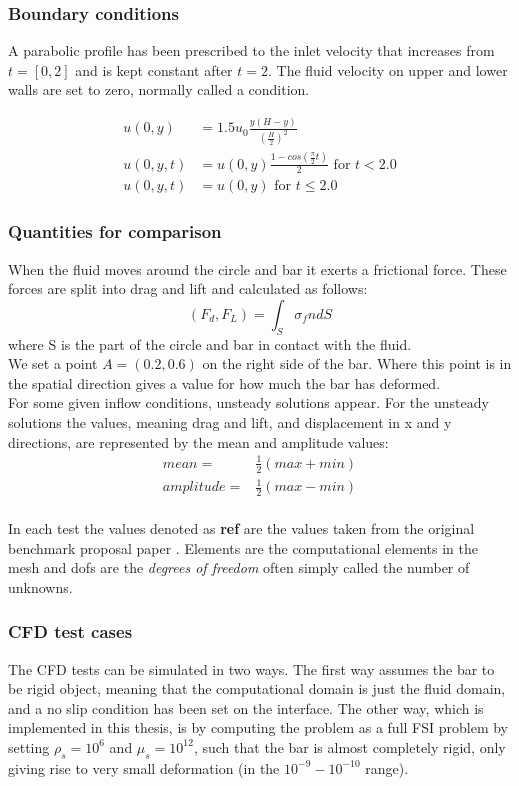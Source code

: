 \subsubsection*{Boundary conditions}
A parabolic profile has been prescribed to the inlet velocity that increases from $t=[0,2]$ and is kept constant after $t = 2$.
The fluid velocity on upper and lower walls are set to zero, normally called a  condition.

\begin{align*}
u(0,y) &= 1.5u_0 \frac{y(H-y)}{(\frac{H}{2})^2}  \\
u(0,y,t) &= u(0,y)\frac{1-cos(\frac{\pi}{2}t)}{2} \text{  for  } t<2.0 \\
u(0,y,t) &= u(0,y) \text{  for  } t \leq 2.0
\end{align*}

\subsubsection*{Quantities for comparison}
When the fluid moves around the circle and bar it exerts a frictional force. These forces are split into drag and lift and calculated as follows:
$$ (F_d, F_L) = \int_S \sigma_f n dS $$ 
where S is the part of the circle and bar in contact with the fluid. \\
We set a point $A = (0.2,0.6)$ on the right side of the bar. Where this point is in the spatial direction gives a value for how much the bar has deformed. \\
For some given inflow conditions, unsteady solutions appear. For the unsteady solutions the values, meaning drag and lift, and displacement in x and y directions, are represented by the mean and amplitude values:
\begin{align}
mean =& \frac{1}{2} (max + min) \\
amplitude =& \frac{1}{2} (max - min)\\
\end{align}

In each test the values denoted as \textbf{ref} are the values taken from the original benchmark proposal paper \cite{Hron2006a}. Elements are the computational elements in the mesh and dofs are the \textit{degrees of freedom} often simply called the number of unknowns.

\subsubsection{CFD test cases}
The CFD tests can be simulated in two ways. The first way assumes the bar to be rigid object, meaning that the computational domain is just the fluid domain, and a no slip condition has been set on the interface. The other way, which is implemented in this thesis, is by computing the problem as a full FSI problem by setting $\rho_s=10^{6}$ and $\mu_s=10^{12}$, such that the bar is almost completely rigid, only giving rise to very small deformation (in the $10^{-9}-10^{-10}$ range).

